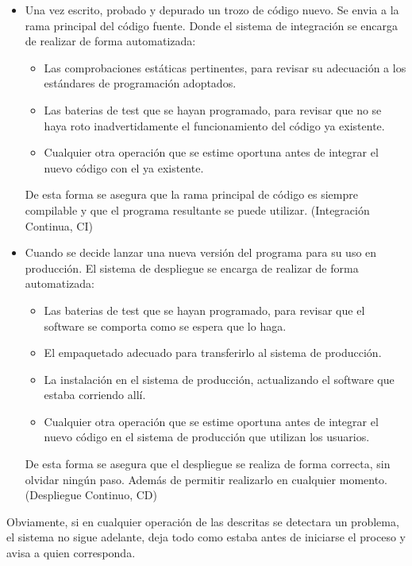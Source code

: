 \documentclass[spanish,12pt,a4paper,final,oneside]{book}
\begin{document}
\begin{itemize}

\item Una vez escrito, probado y depurado un trozo de código nuevo. Se envia a la rama principal del código fuente. Donde el sistema de integración se encarga de realizar de forma automatizada:

\begin{itemize}
\item Las comprobaciones estáticas pertinentes, para revisar su adecuación a los estándares de programación adoptados.
\item Las baterias de test que se hayan programado, para revisar que no se haya roto inadvertidamente el funcionamiento del código ya existente.
\item Cualquier otra operación que se estime oportuna antes de integrar el nuevo código con el ya existente.
\end{itemize}

De esta forma se asegura que la rama principal de código es siempre compilable y que el programa resultante se puede utilizar. (Integración Continua, CI)


\item Cuando se decide lanzar una nueva versión del programa para su uso en producción. El sistema de despliegue se encarga de realizar de forma automatizada:

\begin{itemize}
\item Las baterias de test que se hayan programado, para revisar que el software se comporta como se espera que lo haga.
\item El empaquetado adecuado para transferirlo al sistema de producción.
\item La instalación en el sistema de producción, actualizando el software que estaba corriendo allí.
\item Cualquier otra operación que se estime oportuna antes de integrar el nuevo código en el sistema de producción que utilizan los usuarios. \end{itemize}

De esta forma se asegura que el despliegue se realiza de forma correcta, sin olvidar ningún paso. Además de permitir realizarlo en cualquier momento. (Despliegue Continuo, CD)

\end{itemize}

Obviamente, si en cualquier operación de las descritas se detectara un problema, el sistema no sigue adelante, deja todo como estaba antes de iniciarse el proceso y avisa a quien corresponda.
\end{document}
